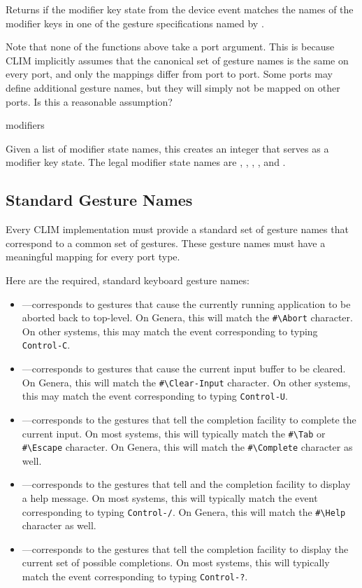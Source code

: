 Returns  if the modifier key state from the device event 
matches the names of the modifier keys in one of the gesture specifications
named by .

 {Note that none of the functions above take a port argument.  This
is because CLIM implicitly assumes that the canonical set of gesture names is
the same on every port, and only the mappings differ from port to port.  Some
ports may define additional gesture names, but they will simply not be mapped on
other ports.  Is this a reasonable assumption?}

 {\rest modifiers}

Given a list of modifier state names, this creates an integer that serves as a
modifier key state.  The legal modifier state names are ,
, , , and .


\subsection {Standard Gesture Names}

Every CLIM implementation must provide a standard set of gesture names that
correspond to a common set of gestures.  These gesture names must have a
meaningful mapping for every port type.

Here are the required, standard keyboard gesture names:

\begin{itemize}
\item {}---corresponds to gestures that cause the currently running
application to be aborted back to top-level.  On Genera, this will match the
\verb+#\Abort+ character.  On other systems, this may match the event
corresponding to typing {\tt Control-C}.

\item {}---corresponds to gestures that cause the current input
buffer to be cleared.  On Genera, this will match the \verb+#\Clear-Input+
character.  On other systems, this may match the event corresponding to typing
{\tt Control-U}.

\item {}---corresponds to the gestures that tell the completion
facility to complete the current input.  On most systems, this will typically
match the \verb+#\Tab+ or \verb+#\Escape+ character.  On Genera, this will match
the \verb+#\Complete+ character as well.

\item {}---corresponds to the gestures that tell  and the
completion facility to display a help message.  On most systems, this will
typically match the event corresponding to typing {\tt Control-/}.  On Genera,
this will match the \verb+#\Help+ character as well.

\item {}---corresponds to the gestures that tell the completion
facility to display the current set of possible completions.  On most systems,
this will typically match the event corresponding to typing {\tt Control-?}.
\end{itemize}

